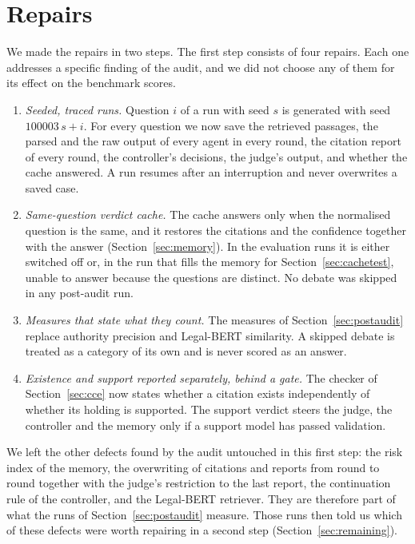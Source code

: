 \documentclass[conference]{IEEEtran}
\begin{document}
\section{Repairs}\label{sec:repairs}
We made the repairs in two steps. The first step consists of four repairs. Each one addresses a specific finding of the audit, and we did not choose any of them for its effect on the benchmark scores.
\begin{enumerate}
\item \emph{Seeded, traced runs.} Question $i$ of a run with seed $s$ is generated with seed $100003\,s + i$. For every question we now save the retrieved passages, the parsed and the raw output of every agent in every round, the citation report of every round, the controller's decisions, the judge's output, and whether the cache answered. A run resumes after an interruption and never overwrites a saved case.
\item \emph{Same-question verdict cache.} The cache answers only when the normalised question is the same, and it restores the citations and the confidence together with the answer (Section~\ref{sec:memory}). In the evaluation runs it is either switched off or, in the run that fills the memory for Section~\ref{sec:cachetest}, unable to answer because the questions are distinct. No debate was skipped in any post-audit run.
\item \emph{Measures that state what they count.} The measures of Section~\ref{sec:postaudit} replace authority precision and Legal-BERT similarity. A skipped debate is treated as a category of its own and is never scored as an answer.
\item \emph{Existence and support reported separately, behind a gate.} The checker of Section~\ref{sec:cce} now states whether a citation exists independently of whether its holding is supported. The support verdict steers the judge, the controller and the memory only if a support model has passed validation.
\end{enumerate}
We left the other defects found by the audit untouched in this first step: the risk index of the memory, the overwriting of citations and reports from round to round together with the judge's restriction to the last report, the continuation rule of the controller, and the Legal-BERT retriever. They are therefore part of what the runs of Section~\ref{sec:postaudit} measure. Those runs then told us which of these defects were worth repairing in a second step (Section~\ref{sec:remaining}).

\end{document}
